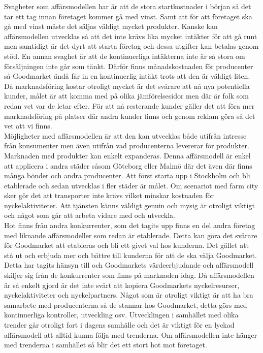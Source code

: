 \documentclass[10pt,a4paper,oneside]{article}
\begin{document}
Svagheter som affärsmodellen har är att de stora startkostnader i början så det tar ett tag innan företaget kommer gå med vinst. Samt att för att företaget ska gå med vinst måste det säljas väldigt mycket produkter. Kanske kan affärsmodellen utvecklas så att det inte krävs lika mycket intäkter för att gå runt men samtidigt är det dyrt att starta företag och dessa utgifter kan betalas genom stöd. En annan svaghet är att de kontinuerliga intäkterna inte är så stora om försäljningen inte går som tänkt. Därför finns månadskostnaden för producenter så Goodmarket ändå får in en kontinuerlig intäkt trots att den är väldigt liten. Då marknadsföring kostar otroligt mycket är det svårare att nå nya potentiella kunder, målet är att komma med på olika jämförelsesidor men där är folk som redan vet var de letar efter. För att nå resterande kunder gäller det att föra mer marknadsföring på platser där andra kunder finns och genom reklam göra så det vet att vi finns. \\ 

Möjligheter med affärsmodellen är att den kan utvecklas både utifrån intresse från konsumenter men även utifrån vad producenterna levererar för produkter. Marknaden med produkter kan enkelt expanderas. Denna affärsmodell är enkel att applicera i andra städer såsom Göteborg eller Malmö där det även där finns många bönder och andra producenter. Att först starta upp i Stockholm och bli etablerade och sedan utvecklas i fler städer är målet. Om scenariot med farm city sker gör det att transporter inte krävs vilket minskar kostnaden för nyckelaktiviteter. Att tjänsten känns väldigt genuin och mysig är otroligt viktigt och något som går att arbeta vidare med och utveckla. \\ 

Hot finns från andra konkurrenter, som det tagits upp finns en del andra företag med liknande affärsmodeller som redan är etablerade. Detta kan göra det svårare för Goodmarket att etableras och bli ett givet val hos kunderna. Det gället att stå ut och erbjuda mer och bättre till kunderna för att de ska välja Goodmarket. Detta har tagits hänsyn till och Goodmarkets värdeerbjudande och affärsmodell skiljer sig från de konkurrenter som finns på marknaden idag. Då affärsmodellen är så enkelt gjord är det inte svårt att kopiera Goodmarkets nyckelresurser, nyckelaktiviteter och nyckelpartners. Något som är otroligt viktigt är att ha bra samarbete med producenterna så de stannar hos Goodmarket, detta görs med kontinuerliga kontroller, utveckling osv. Utvecklingen i samhället med olika trender går otroligt fort i dagens samhälle och det är viktigt för en lyckad affärsmodell att alltid kunna följa med trenderna. Om affärsmodellen inte hänger med trenderna i samhället så blir det ett stort hot mot företaget. 
\end{document}
